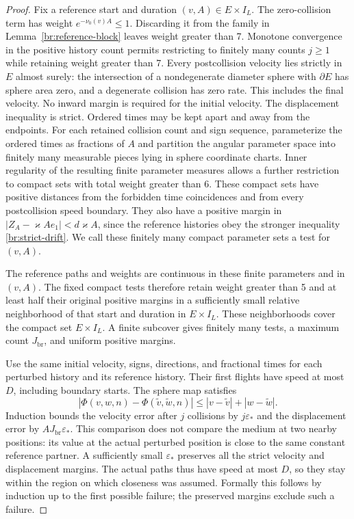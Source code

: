 \begin{proof}
Fix a reference start and duration \((v,A)\in E\times I_L\).
The zero-collision term has weight \(e^{-\nu_0(v)A}\le1\).
Discarding it from the family in Lemma~\ref{br:reference-block}
leaves weight greater than 7. Monotone convergence in the positive
history count permits restricting to finitely many counts
\(j\ge1\) while retaining weight greater than 7. Every postcollision
velocity lies strictly in \(E\) almost surely: the intersection of a
nondegenerate diameter sphere with \(\partial E\) has sphere area zero,
and a degenerate collision has zero rate. This includes the final
velocity. No inward margin is required for the initial velocity.
The displacement inequality
is strict. Ordered times may be kept apart and away from the endpoints.
For each retained collision count and sign sequence, parameterize the
ordered times as fractions of \(A\) and partition the angular parameter
space into finitely many measurable pieces lying in sphere coordinate
charts. Inner regularity of the
resulting finite parameter measures allows a further restriction to
compact sets with total weight greater than 6. These compact sets have
positive distances from the forbidden time coincidences and from every
postcollision speed boundary. They also have a positive margin in
\(|Z_A-\varkappa Ae_1|<d\varkappa A\), since the reference histories obey the
stronger inequality \eqref{br:strict-drift}. We call these finitely many
compact parameter sets a test for \((v,A)\).

The reference paths and weights are continuous in these finite
parameters and in \((v,A)\). The fixed compact tests therefore retain
weight greater than 5 and at least half their original positive
margins in a sufficiently small relative neighborhood of that start
and duration in \(E\times I_L\).
These neighborhoods cover the compact set
\(E\times I_L\). A finite subcover gives finitely many tests, a maximum
count \(J_{\mathrm{br}}\), and uniform positive margins.

Use the same initial velocity, signs, directions, and fractional times
for each perturbed history and its reference history. Their first
flights have speed at most \(D\), including boundary starts.
The sphere map satisfies
\[
|\Phi(v,w,n)-\Phi(\widetilde v,\widetilde w,n)|
\le |v-\widetilde v|+|w-\widetilde w|.
\]
Induction bounds the velocity error after \(j\) collisions by
\(j\varepsilon_*\) and the displacement error by \(AJ_{\mathrm{br}}\varepsilon_*\).
This comparison does not compare the medium at two nearby positions:
its value at the actual perturbed position is close to the same
constant reference partner. A sufficiently small \(\varepsilon_*\)
preserves all the strict velocity and displacement margins. The
actual paths thus have speed at most \(D\), so they stay within the
region on which closeness was assumed. Formally this follows by
induction up to the first possible failure; the preserved margins
exclude such a failure.


\end{proof}
